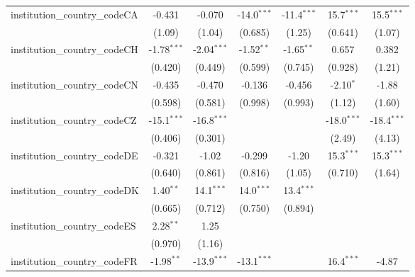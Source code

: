 \begin{tabular}{lcccccc}
   institution\_country\_codeCA          & -0.431        & -0.070        & -14.0$^{***}$ & -11.4$^{***}$ & 15.7$^{***}$  & 15.5$^{***}$\\   
                                         & (1.09)        & (1.04)        & (0.685)       & (1.25)        & (0.641)       & (1.07)\\   
   institution\_country\_codeCH          & -1.78$^{***}$ & -2.04$^{***}$ & -1.52$^{**}$  & -1.65$^{**}$  & 0.657         & 0.382\\   
                                         & (0.420)       & (0.449)       & (0.599)       & (0.745)       & (0.928)       & (1.21)\\   
   institution\_country\_codeCN          & -0.435        & -0.470        & -0.136        & -0.456        & -2.10$^{*}$   & -1.88\\   
                                         & (0.598)       & (0.581)       & (0.998)       & (0.993)       & (1.12)        & (1.60)\\   
   institution\_country\_codeCZ          & -15.1$^{***}$ & -16.8$^{***}$ &               &               & -18.0$^{***}$ & -18.4$^{***}$\\   
                                         & (0.406)       & (0.301)       &               &               & (2.49)        & (4.13)\\   
   institution\_country\_codeDE          & -0.321        & -1.02         & -0.299        & -1.20         & 15.3$^{***}$  & 15.3$^{***}$\\   
                                         & (0.640)       & (0.861)       & (0.816)       & (1.05)        & (0.710)       & (1.64)\\   
   institution\_country\_codeDK          & 1.40$^{**}$   & 14.1$^{***}$  & 14.0$^{***}$  & 13.4$^{***}$  &               &   \\   
                                         & (0.665)       & (0.712)       & (0.750)       & (0.894)       &               &   \\   
   institution\_country\_codeES          & 2.28$^{**}$   & 1.25          &               &               &               &   \\   
                                         & (0.970)       & (1.16)        &               &               &               &   \\   
   institution\_country\_codeFR          & -1.98$^{**}$  & -13.9$^{***}$ & -13.1$^{***}$ &               & 16.4$^{***}$  & -4.87\\   

\end{tabular}
